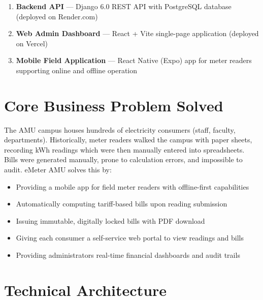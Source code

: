 \documentclass[12pt, a4paper]{report}
\newenvironment{featurelist}{%
    \begin{itemize}[leftmargin=1.5em, itemsep=2pt, parsep=0pt]
}{%
    \end{itemize}
}
\begin{document}
\begin{enumerate}[leftmargin=1.8em, itemsep=4pt]
    \item \textbf{Backend API} — Django 6.0 REST API with PostgreSQL database (deployed on Render.com)
    \item \textbf{Web Admin Dashboard} — React + Vite single-page application (deployed on Vercel)
    \item \textbf{Mobile Field Application} — React Native (Expo) app for meter readers supporting online and offline operation
\end{enumerate}

\section{Core Business Problem Solved}

The AMU campus houses hundreds of electricity consumers (staff, faculty, departments). Historically, meter readers walked the campus with paper sheets, recording kWh readings which were then manually entered into spreadsheets. Bills were generated manually, prone to calculation errors, and impossible to audit. eMeter AMU solves this by:

\begin{featurelist}
    \item Providing a mobile app for field meter readers with offline-first capabilities
    \item Automatically computing tariff-based bills upon reading submission
    \item Issuing immutable, digitally locked bills with PDF download
    \item Giving each consumer a self-service web portal to view readings and bills
    \item Providing administrators real-time financial dashboards and audit trails
\end{featurelist}

\section{Technical Architecture}
\end{document}
